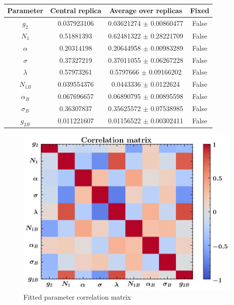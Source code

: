 \documentclass[
]{article}
\begin{document}
\begin{table}[h]

\centering

\begin{tabular}{|c|c|c|c|} \hline

\textbf{Parameter} & \textbf{Central replica} & \textbf{Average over
replicas} & \textbf{Fixed} \\ \hline

\(g_2\) & 0.037923106 & 0.03621274 \(\pm\) 0.00860477 & False \\ \hline
\(N_1\) & 0.51881393 & 0.62481322 \(\pm\) 0.28221709 & False \\ \hline
\(\alpha\) & 0.20314198 & 0.20644958 \(\pm\)
0.00983289 & False \\ \hline
\(\sigma\) & 0.37327219 & 0.37011055 \(\pm\)
0.06267228 & False \\ \hline
\(\lambda\) & 0.57973261 & 0.5797666 \(\pm\)
0.09166202 & False \\ \hline
\(N_{1B}\) & 0.039554376 & 0.0443336 \(\pm\) 0.0122624 & False \\ \hline
\(\alpha_B\) & 0.067696657 & 0.06890795 \(\pm\)
0.00895598 & False \\ \hline
\(\sigma_B\) & 0.36307837 & 0.35625572 \(\pm\)
0.07538985 & False \\ \hline
\(g_{2B}\) & 0.011221607 & 0.01156522 \(\pm\)
0.00302411 & False \\ \hline

\end{tabular}

\caption{}

\end{table}

\begin{figure}
\centering
\includegraphics{pngplots/CorrelationMatrix.png}
\caption{Fitted parameter correlation matrix}
\end{figure}
\end{document}
